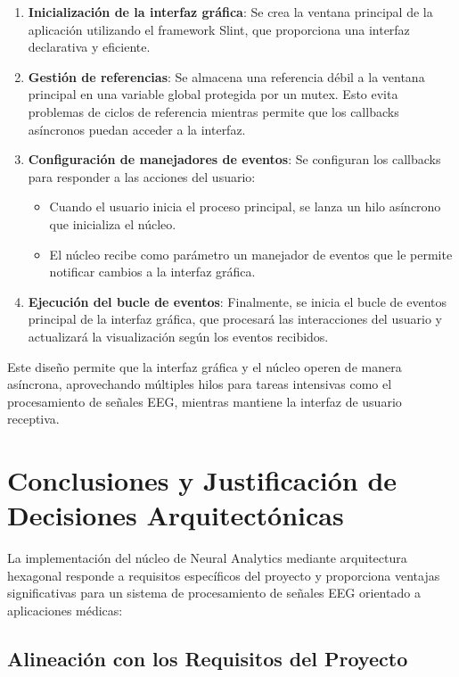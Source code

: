 \begin{enumerate}
    \item \textbf{Inicialización de la interfaz gráfica}: Se crea la ventana principal de la aplicación utilizando el framework Slint, que proporciona una interfaz declarativa y eficiente.
    
    \item \textbf{Gestión de referencias}: Se almacena una referencia débil a la ventana principal en una variable global protegida por un mutex. Esto evita problemas de ciclos de referencia mientras permite que los callbacks asíncronos puedan acceder a la interfaz.
    
    \item \textbf{Configuración de manejadores de eventos}: Se configuran los callbacks para responder a las acciones del usuario:
    \begin{itemize}
        \item Cuando el usuario inicia el proceso principal, se lanza un hilo asíncrono que inicializa el núcleo.
        \item El núcleo recibe como parámetro un manejador de eventos que le permite notificar cambios a la interfaz gráfica.
    \end{itemize}
    
    \item \textbf{Ejecución del bucle de eventos}: Finalmente, se inicia el bucle de eventos principal de la interfaz gráfica, que procesará las interacciones del usuario y actualizará la visualización según los eventos recibidos.
\end{enumerate}

Este diseño permite que la interfaz gráfica y el núcleo operen de manera asíncrona, aprovechando múltiples hilos para tareas intensivas como el procesamiento de señales EEG, mientras mantiene la interfaz de usuario receptiva.

\section{Conclusiones y Justificación de Decisiones Arquitectónicas}

La implementación del núcleo de Neural Analytics mediante arquitectura hexagonal responde a requisitos específicos del proyecto y proporciona ventajas significativas para un sistema de procesamiento de señales EEG orientado a aplicaciones médicas:

\subsection{Alineación con los Requisitos del Proyecto}

